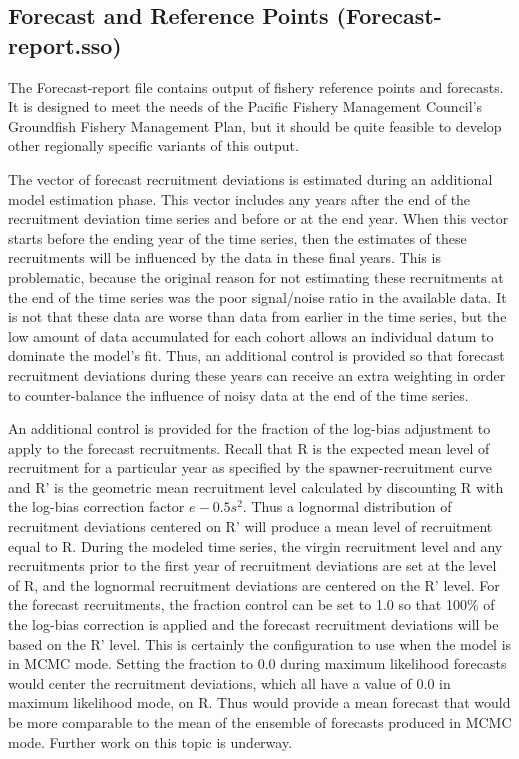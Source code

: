 \subsection{Forecast and Reference Points (Forecast-report.sso)}
The Forecast-report file contains output of fishery reference points and forecasts.  It is designed to meet the needs of the Pacific Fishery Management Council's Groundfish Fishery Management Plan, but it should be quite feasible to develop other regionally specific variants of this output.

The vector of forecast recruitment deviations is estimated during an additional model estimation phase.  This vector includes any years after the end of the recruitment deviation time series and before or at the end year. When this vector starts before the ending year of the time series, then the estimates of these recruitments will be influenced by the data in these final years. This is problematic, because the original reason for not estimating these recruitments at the end of the time series was the poor signal/noise ratio in the available data. It is not that these data are worse than data from earlier in the time series, but the low amount of data accumulated for each cohort allows an individual datum to dominate the model's fit. Thus, an additional control is provided so that forecast recruitment deviations during these years can receive an extra weighting in order to counter-balance the influence of noisy data at the end of the time series.

An additional control is provided for the fraction of the log-bias adjustment to apply to the forecast recruitments. Recall that R is the expected mean level of recruitment for a particular year as specified by the spawner-recruitment curve and R' is the geometric mean recruitment level calculated by discounting R with the log-bias correction factor $e-0.5s^2$. Thus a lognormal distribution of recruitment deviations centered on R' will produce a mean level of recruitment equal to R. During the modeled time series, the virgin recruitment level and any recruitments prior to the first year of recruitment deviations are set at the level of R, and the lognormal recruitment deviations are centered on the R' level.  For the forecast recruitments, the fraction control can be set to 1.0 so that 100\% of the log-bias correction is applied and the forecast recruitment deviations will be based on the R' level. This is certainly the configuration to use when the model is in MCMC mode. Setting the fraction to 0.0 during maximum likelihood forecasts would center the recruitment deviations, which all have a value of 0.0 in maximum likelihood mode, on R. Thus would provide a mean forecast that would be more comparable to the mean of the ensemble of forecasts produced in MCMC mode.  Further work on this topic is underway.

